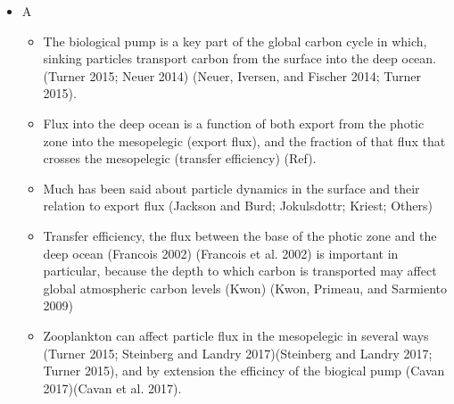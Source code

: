 \documentclass[]{article}
\providecommand{\tightlist}{%
  \setlength{\itemsep}{0pt}\setlength{\parskip}{0pt}}
\begin{document}
\begin{itemize}
\tightlist
\item
  A

  \begin{itemize}
  \tightlist
  \item
    The biological pump is a key part of the global carbon cycle in
    which, sinking particles transport carbon from the surface into the
    deep ocean. (Turner 2015; Neuer 2014) (Neuer, Iversen, and Fischer
    2014; Turner 2015).
  \item
    Flux into the deep ocean is a function of both export from the
    photic zone into the mesopelegic (export flux), and the fraction of
    that flux that crosses the mesopelegic (transfer efficiency) (Ref).
  \item
    Much has been said about particle dynamics in the surface and their
    relation to export flux (Jackson and Burd; Jokulsdottr; Kriest;
    Others)
  \item
    Transfer efficiency, the flux between the base of the photic zone
    and the deep ocean (Francois 2002) (Francois et al. 2002) is
    important in particular, because the depth to which carbon is
    transported may affect global atmospheric carbon levels (Kwon)
    (Kwon, Primeau, and Sarmiento 2009)
  \item
    Zooplankton can affect particle flux in the mesopelegic in several
    ways (Turner 2015; Steinberg and Landry 2017)(Steinberg and Landry
    2017; Turner 2015), and by extension the efficincy of the biogical
    pump (Cavan 2017)(Cavan et al. 2017).


\end{itemize}
\end{itemize}
\end{document}
